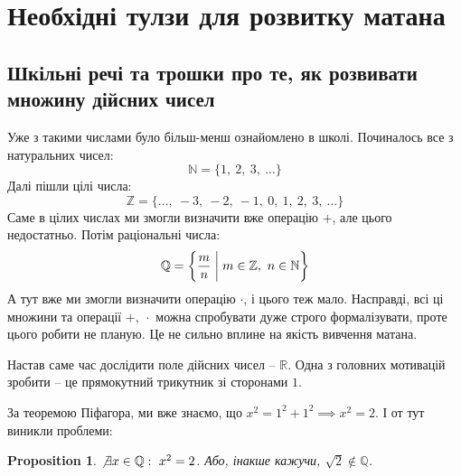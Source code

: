\documentclass[a4paper, 14pt]{article}
\theoremstyle{theoremdd}
\theoremstyle{theoremdd}
\theoremstyle{theoremdd}
\theoremstyle{theoremdd}
\theoremstyle{theoremdd}
\newtheorem{proposition}[theorem]{Proposition}
\theoremstyle{theoremdd}
\theoremstyle{theoremdd}
\theoremstyle{theoremdd}
\begin{document}

\tableofcontents
\newpage

	\section*{Необхідні тулзи для розвитку матана}
	\subsection*{Шкільні речі та трошки про те, як розвивати множину дійсних чисел}
	
	Уже з такими числами було більш-менш ознайомлено в школі. Починалось все з натуральних чисел:	
	$$ \mathbb{N} = \{1, \ 2, \ 3, \ \dots\} $$
	Далі пішли цілі  числа: \\
	$$ \mathbb{Z} = \{\dots,\ -3 ,\ -2, \ -1,\ 0,\ 1,\ 2,\ 3,\ \dots\} $$
	Саме в цілих числах ми змогли визначити вже операцію $+$, але цього недостатньо. Потім раціональні числа: \\
	$$ \mathbb{Q} = \left\{ \dfrac{m}{n} \biggm| m \in \mathbb{Z},\ n \in \mathbb{N} \right\} $$
	А тут вже ми змогли визначити операцію $\cdot$, і цього теж мало. Насправді, всі ці множини та операції $+,\ \cdot$ можна спробувати дуже строго формалізувати, проте цього робити не планую. Це не сильно вплине на якість вивчення матана.
	
	Настав саме час дослідити поле дійсних чисел -- $\mathbb{R}$. Одна з головних мотивацій зробити -- це прямокутний трикутник зі сторонами $1$.
	\begin{figure}[H]
	\centering
	\end{figure}
	За теоремою Піфагора, ми вже знаємо, що
	$x^2 = 1^2 + 1^2 \implies x^2 = 2$. І от тут виникли проблеми:
	\begin{proposition}
	$\not\exists  x \in \mathbb{Q}: \ x^2 = 2$. Або, інакше кажучи, $\sqrt{2} \not\in \mathbb{Q}$.
	\end{proposition}
	
\end{document}
